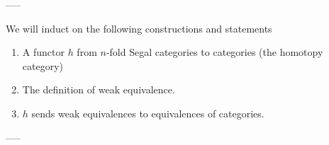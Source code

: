 \documentclass{amsart}
\begin{document}
-----

We will induct on the following constructions and statements
\begin{enumerate}
	\item A functor $h$ from $n$-fold Segal categories to categories (the homotopy category)
	\item The definition of weak equivalence.
	\item $h$ sends weak equivalences to equivalences of categories. 
\end{enumerate}




-----


\end{document}
